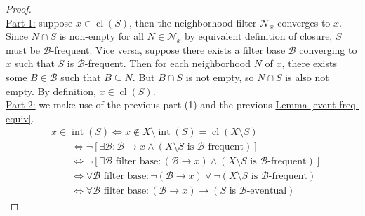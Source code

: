 \documentclass{treatise}
\begin{document}
\begin{proof} \ \\
\underline{Part 1:} suppose $x \in \operatorname{cl}(S)$, then the neighborhood filter $\mathcal{N}_x$ converges to $x$. Since $N \cap S$ is non-empty for all $N \in \mathcal{N}_x$ by equivalent definition of closure, $S$ must be $\mathcal{B}$-frequent. Vice versa, suppose there exists a filter base $\mathcal{B}$ converging to $x$ such that $S$ is $\mathcal{B}$-frequent. Then for each neighborhood $N$ of $x$, there exists some $B \in \mathcal{B}$ such that $B \subseteq N$. But $B \cap S$ is not empty, so $N \cap S$ is also not empty. By definition, $x \in \operatorname{cl}(S)$.
\\
\underline{Part 2:} we make use of the previous part (1) and the previous \hyperref[event-freq-equiv]{Lemma \ref*{event-freq-equiv}}.
\begin{align*}
    & x \in \operatorname{int}(S) \Leftrightarrow x \notin X \setminus \operatorname{int}(S) = \operatorname{cl}(X \setminus S)
    \\
    & \qquad \Leftrightarrow \neg [\exists \mathcal{B} : \mathcal{B} \to x \wedge (X \setminus S \mbox{ is } \mathcal{B} \mbox{-frequent})]
    \\
    & \qquad \Leftrightarrow \neg [\exists \mathcal{B} \mbox{ filter base}: (\mathcal{B} \to x) \wedge (X \setminus S \mbox{ is } \mathcal{B} \mbox{-frequent})]
    \\
    & \qquad \Leftrightarrow \forall \mathcal{B} \mbox{ filter base}: \neg(\mathcal{B} \to x) \vee \neg(X \setminus S \mbox{ is } \mathcal{B} \mbox{-frequent})
    \\
    & \qquad \Leftrightarrow \forall \mathcal{B} \mbox{ filter base}: (\mathcal{B} \to x) \rightarrow (S \mbox{ is } \mathcal{B} \mbox{-eventual})
\end{align*}
\end{proof}
\end{document}
